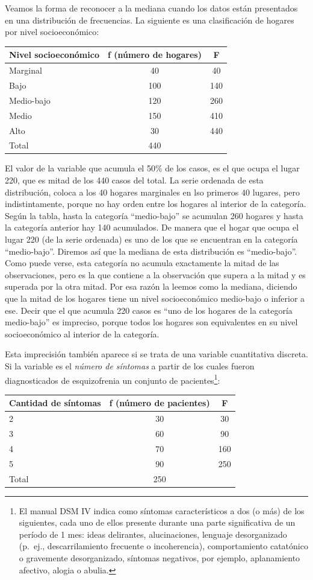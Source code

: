 \documentclass[]{book}
\let\rmarkdownfootnote\footnote%
\def\footnote{\protect\rmarkdownfootnote}
\begin{document}
Veamos la forma de reconocer a la mediana cuando los datos están
presentados en una distribución de frecuencias. La siguiente es una
clasificación de hogares por nivel socioeconómico:

\begin{longtable}[]{@{}lcc@{}}
\toprule
Nivel socioeconómico & f (número de hogares) & F\tabularnewline
\midrule
\endhead
Marginal & 40 & 40\tabularnewline
Bajo & 100 & 140\tabularnewline
Medio-bajo & 120 & 260\tabularnewline
Medio & 150 & 410\tabularnewline
Alto & 30 & 440\tabularnewline
Total & 440 &\tabularnewline
\bottomrule
\end{longtable}

El valor de la variable que acumula el 50\% de los casos, es el que ocupa el lugar 220, que es mitad de los 440 casos del total. La serie ordenada de esta distribución, coloca a los 40 hogares marginales en lso primeros 40 lugares, pero indistintamente, porque no hay orden entre los hogares al interior de la categoría. Según la tabla, hasta la categoría ``medio-bajo'' se acumulan 260 hogares y hasta la categoría anterior hay 140 acumulados. De manera que el hogar que ocupa el lugar 220 (de la serie ordenada) es uno de los que se encuentran en la categoría ``medio-bajo''. Diremos así que la mediana de esta distribución es ``medio-bajo''. Como puede verse, esta categoría no acumula exactamente la mitad de las observaciones, pero es la que contiene a la observación que supera a la mitad y es superada por la otra mitad. Por esa razón la leemos como la mediana, diciendo que la mitad de los hogares tiene un nivel socioeconómico medio-bajo o inferior a ese. Decir que el que acumula 220 casos es ``uno de los hogares de la categoría medio-bajo'' es impreciso, porque todos los hogares son equivalentes en su nivel socioeconómico al interior de la categoría.

Esta imprecisión también aparece si se trata de
una variable cuantitativa discreta. Si la variable es el \emph{número de síntomas} a partir de los cuales fueron diagnosticados de esquizofrenia un conjunto de pacientes\footnote{El manual DSM IV indica como síntomas característicos a dos (o más) de los siguientes, cada uno de ellos presente durante una parte significativa de un período de 1 mes: ideas delirantes, alucinaciones, lenguaje desorganizado (p.~ej., descarrilamiento frecuente o incoherencia), comportamiento catatónico o gravemente desorganizado, síntomas negativos, por ejemplo, aplanamiento afectivo, alogia o abulia.}:

\begin{longtable}[]{@{}lcc@{}}
\toprule
Cantidad de síntomas & f (número de pacientes) & F\tabularnewline
\midrule
\endhead
2 & 30 & 30\tabularnewline
3 & 60 & 90\tabularnewline
4 & 70 & 160\tabularnewline
5 & 90 & 250\tabularnewline
Total & 250 &\tabularnewline
\bottomrule
\end{longtable}
\end{document}
